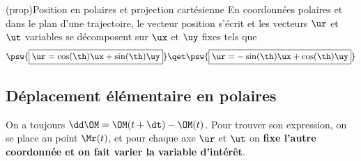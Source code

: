 \documentclass[../../main/main.tex]{subfiles}
\begin{document}
\begin{tcb*}(prop){Position en polaires et projection cartésienne}
	En coordonnées polaires et dans le plan d'une trajectoire, le vecteur
	position s'écrit
	\psw{\[\boxed{\OM = r\ur}\]}
	et les vecteurs $\ur$ et $\ut$ variables se décomposent sur $\ux$ et $\uy$
	fixes tels que
	\[
		\psw{\boxed{\ur = \cos(\th)\ux + \sin(\th)\uy}}
		\qet
		\psw{\boxed{\ur = -\sin(\th)\ux + \cos(\th)\uy}}
	\]
\end{tcb*}

\subsection{Déplacement élémentaire en polaires}
On a toujours $\dd\OM = \OM(t+\dt) - \OM(t)$. Pour trouver son expression, on se
place au point $\Mr (t)$, et pour chaque axe $\ur$ et $\ut$ on \textbf{fixe
	l'autre coordonnée et on fait varier la variable d'intérêt}.
\end{document}
